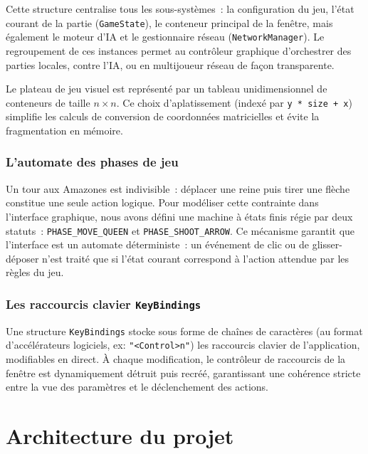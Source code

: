 \documentclass[a4paper]{article}
\begin{document}
Cette structure centralise tous les sous-systèmes~: la configuration du jeu, l'état courant de la partie (\texttt{GameState}), le conteneur principal de la fenêtre, mais également le moteur d'IA et le gestionnaire réseau (\texttt{NetworkManager}). Le regroupement de ces instances permet au contrôleur graphique d'orchestrer des parties locales, contre l'IA, ou en multijoueur réseau de façon transparente.

Le plateau de jeu visuel est représenté par un tableau unidimensionnel de conteneurs
de taille $n \times n$. Ce choix d'aplatissement (indexé par \texttt{y * size + x}) simplifie les calculs de conversion de coordonnées matricielles et évite la fragmentation en mémoire.

\subsubsection{L'automate des phases de jeu}

Un tour aux Amazones est indivisible~: déplacer une reine puis tirer une
flèche constitue une seule action logique. Pour modéliser cette contrainte
dans l'interface graphique, nous avons défini une machine à états finis régie par
deux statuts~: \texttt{PHASE\_MOVE\_QUEEN} et \texttt{PHASE\_SHOOT\_ARROW}. Ce mécanisme
garantit que l'interface est un automate déterministe~: un événement de clic ou de
glisser-déposer n'est traité que si l'état courant correspond à l'action
attendue par les règles du jeu.

\subsubsection{Les raccourcis clavier \texttt{KeyBindings}}

Une structure \texttt{KeyBindings} stocke sous forme de chaînes de caractères
(au format d'accélérateurs logiciels, ex: \texttt{"<Control>n"}) les
raccourcis clavier de l'application, modifiables en direct. À chaque modification,
le contrôleur de raccourcis de la fenêtre est dynamiquement détruit puis recréé,
garantissant une cohérence stricte entre la vue des paramètres et le déclenchement
des actions.

\newpage

\section{Architecture du projet}
\label{sec:architecture}
\end{document}
